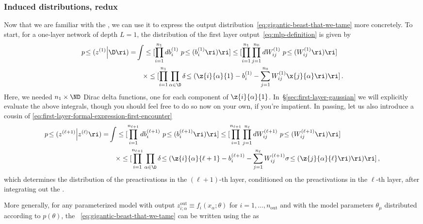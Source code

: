 \subsubsection{Induced distributions, redux}

Now that we are familiar with the , we can use it to express the output distribution~\eqref{eq:gigantic-beast-that-we-tame} more concretely.
To start, for a one-layer network of depth $L=1$, the distribution of the first layer output~\eqref{eq:mlp-definition} is given by
\begin{align}\label{eq:first-layer-formal-expression-first-encounter}
p\!\le(z^{(1)} \Big| \D \ri)=&\int \le[  \prod_{i=1}^{n_1} d b^{(1)}_{i}\ p\!\le(b_{i}^{(1)}\ri) \ri]  \le[\prod_{i=1}^{n_1}\prod_{j=1}^{n_0} d W^{(1)}_{ij}\ p\!\le(W^{(1)}_{ij}\ri) \ri]\, \\
&\quad\times\le[ \prod_{i=1}^{n_{1}}\prod_{\alpha\in\D}\delta\!\le(\z{i}{\alpha}{1}-b^{(1)}_i-\sum_{j=1}^{n_0}W^{(1)}_{ij}\x{j}{\alpha}\ri)\ri]\, .\nonumber
\end{align}
Here, we needed $n_1 \times \ND$ Dirac delta functions, one for each component of $\z{i}{\alpha}{1}$. In~\S\ref{sec:first-layer-gaussian} we will explicitly evaluate the above integrals, though you should feel free to do so now on your own, if you're impatient.
In passing, let us also introduce a cousin of \eqref{eq:first-layer-formal-expression-first-encounter} 
\begin{align}\label{eq:deeper-layer-formal-expression-first-encounter}
p\!\le(z^{(\ell+1)} \Big| z^{(\ell)} \ri)=&\int \le[  \prod_{i=1}^{n_{\ell+1}} d b^{(\ell+1)}_{i}\ p\!\le(b_{i}^{(\ell+1)}\ri) \ri]  \le[\prod_{i=1}^{n_{\ell+1}}\prod_{j=1}^{n_{\ell}} d W^{(\ell+1)}_{ij}\ p\!\le(W^{(\ell+1)}_{ij}\ri) \ri]\, \\
&\quad\times\le[ \prod_{i=1}^{n_{\ell+1}}\prod_{\alpha\in\D}\delta\!\le(\z{i}{\alpha}{\ell+1}-b^{(\ell+1)}_i-\sum_{j=1}^{n_\ell}W^{(\ell+1)}_{ij}\sigma\!\le(\z{j}{\alpha}{\ell}\ri)\ri)\ri]\, ,\nonumber
\end{align}
which determines the distribution of the preactivations in the $(\ell+1)$-th layer, conditioned on the preactivations in the $\ell$-th layer, after integrating out the .%


More generally, for any parameterized model with output $z^{\text{out}}_{i;\alpha}\equiv f_i(x_{\alpha};\theta)$ for $i=1,\ldots,n_{\text{out}}$ and with the model parameters $\theta_{\mu}$ distributed according to $p(\theta)$, the ~\eqref{eq:gigantic-beast-that-we-tame} can be written using the  as%


